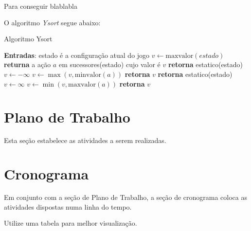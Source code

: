 \documentclass[a4paper,10pt]{article}  %
\begin{document}
Para conseguir blablabla

O algoritmo \textit{Ysort} segue abaixo:

\begin{algorithm}
\caption{Algoritmo Ysort}\label{alg:ysort}
\begin{algorithmic}[1]
\State \textbf{Entradas}: estado é a configuração atual do jogo
\State $v\gets \mathrm{maxvalor}{(estado)}$
\State \textbf{returna} a ação $a$ em sucessores(estado) cujo valor é $v$ %
\EndFunction
{}
   \State \textbf{retorna} estatico(estado)
\EndIf
\State $v \gets -\infty$
    \State $v \gets \max{(v, \mathrm{minvalor}(a))}$
\EndFor
\State \textbf{retorna} $v$
\EndFunction
{}
   \State \textbf{retorna} estatico(estado)
\EndIf
\State $v \gets \infty$
    \State $v \gets \min{(v, \mathrm{maxvalor}(a))}$
\EndFor
\State \textbf{retorna} $v$
\EndFunction
\end{algorithmic}
\end{algorithm}

\section{Plano de Trabalho}

Esta seção estabelece as atividades a serem realizadas.

\section{Cronograma}

Em conjunto com a seção de Plano de Trabalho, a seção de cronograma coloca as atividades dispostas numa linha do tempo.

Utilize uma tabela para melhor visualização.
\end{document}
